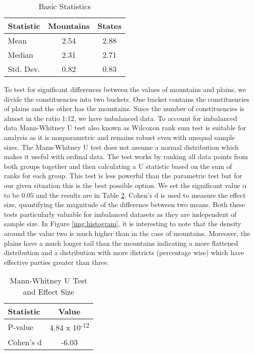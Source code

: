 \begin{table}[h]
\centering
\begin{tabular}{|l|c|c|}
\hline
Statistic & Mountains & States \\
\hline
Mean & 2.54 & 2.88 \\
Median & 2.31 & 2.71 \\
Std. Dev. & 0.82 & 0.83 \\
\hline
\end{tabular}
\caption{Basic Statistics}

\label{tab:basic_stats}
\end{table}

To test for significant differences between the values of mountains and plains, we divide the constituencies into two buckets. One bucket contains the constituencies of plains and the other has the mountains. Since the number of constituencies is almost in the ratio 1:12, we have imbalanced data. To account for imbalanced data Mann-Whitney U test also known as  Wilcoxon rank sum test is suitable for analysis as it is nonparametric and remains robust even with unequal sample sizes. The Mann-Whitney U test does not assume a normal distribution which makes it  useful with ordinal data. The test works by ranking all data points from both groups together and then calculating a U statistic based on the sum of ranks for each group. This test is less powerful than the parametric test but for our given situation this is the best possible option. We set the significant value $\alpha$ to be $0.05$ and the results are in Table \ref{tab:stats_tests}. Cohen's d is used to measure the effect size, quantifying the magnitude of the difference between two means. Both these tests particularly valuable for imbalanced datasets as they are independent of sample size. In Figure \ref{img:histogram}, it is interesting to note that the density around the value two is much higher than in the case of mountains. Moreover, the plains have a much longer tail than the mountains indicating a more flattened distribution and a distribution with more districts (percentage wise) which have effective parties greater than three. 

\begin{table}[h]
\centering
\begin{tabular}{|l|c|}
\hline
Statistic & Value \\
\hline
P-value & 4.84 x 10\textsuperscript{-12} \\
Cohen's d & -6.03 \\
\hline
\end{tabular}
\label{tab:stats_tests}
\caption{Mann-Whitney U Test and Effect Size}

\end{table}


